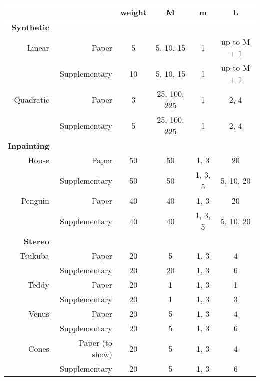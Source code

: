 \documentclass{article}
\begin{document}
\begin{tabular}{r|r|c|c|c|c}
\hline
{} & {} & weight & M & m & L \\
\hline
\bf Synthetic & {} & {} & {} & {} & {} \\
\hline
Linear & Paper & 5 & {5, 10, 15} & 1 & up to M + 1 \\
{} & Supplementary & 10 & {5, 10, 15} & 1 & up to M + 1 \\
\hline
Quadratic & Paper & 3 & {25, 100, 225} & 1 & {2, 4} \\
{} & Supplementary & 5 & {25, 100, 225} & 1 & {2, 4} \\
\hline
\bf Inpainting & {} & {} & {} & {} & {} \\
\hline
House & Paper & 50 & 50 & {1, 3} & 20 \\
{} & Supplementary & {50} & {50} & {1, 3, 5} & {5, 10, 20} \\
\hline
Penguin & Paper & 40 & 40 & {1, 3} & 20 \\
{} & Supplementary & {40} & {40} & {1, 3, 5} & {5, 10, 20} \\
\hline
\bf Stereo & {} & {} & {} & {} & {} \\
\hline
Tsukuba & Paper & 20 & 5 & {1, 3} & 4 \\
{} & Supplementary & {20} & {20} & {1, 3} & {6} \\
\hline
Teddy & Paper & 20 & 1 & {1, 3} & 1 \\
{} & Supplementary & {20} & {1} & {1, 3} & {3} \\
\hline
Venus & Paper & 20 & 5 & {1, 3} & 4 \\
{} & Supplementary & {20} & {5} & {1, 3} & {6} \\
\hline
Cones & Paper (to show) & {20} & {5} & {1, 3} & {4} \\
{} & Supplementary & {20} & {5} & {1, 3} & {6} \\
\hline
\end{tabular}
\end{document}

